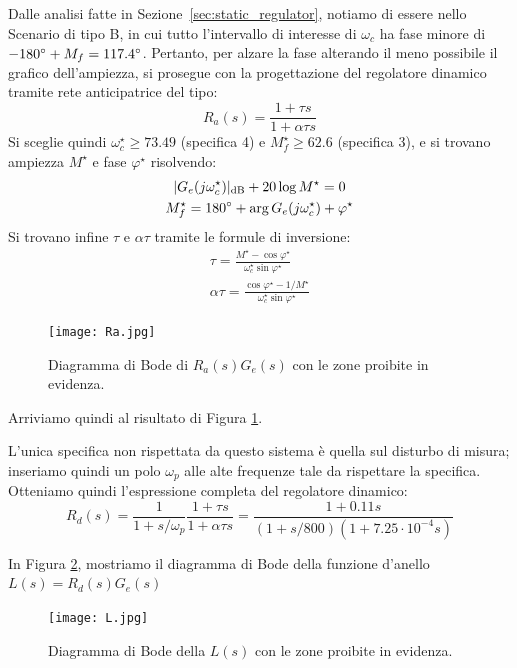 \documentclass[a4paper, 11pt]{article}
\begin{document}
	Dalle analisi fatte in Sezione~\ref{sec:static_regulator}, notiamo di essere nello Scenario di tipo B, in cui tutto l'intervallo di interesse di $\omega_c$ ha fase minore di $-180\degree+M_f = 117.4\degree$.
	Pertanto, per alzare la fase alterando il meno possibile il grafico dell'ampiezza, si prosegue con la progettazione del regolatore dinamico tramite rete anticipatrice del tipo:
	\[
	R_a(s) = \frac{1+\tau s}{1+\alpha\tau s}
	\]
	Si sceglie quindi $\omega_c^\star \ge 73.49$ (specifica 4) e $M_f^\star \ge 62.6$ (specifica 3), e si trovano ampiezza $M^\star$ e fase $\varphi^\star$ risolvendo:
	\begin{subequations}
		\begin{gather}
			|G_e(j\omega_c^\star)|_{\text{dB}}+20\log M^\star = 0 \\
			M_f^\star = 180\degree + \arg G_e(j\omega_c^\star) + \varphi^\star
		\end{gather}	
	\end{subequations}
	Si trovano infine $\tau$ e $\alpha\tau$ tramite le formule di inversione:
	\begin{subequations}
		\begin{gather}
			\tau = \frac{M^\star-\cos\varphi^\star}{\omega_c^\star\sin\varphi^\star} \\
			\alpha\tau = \frac{\cos\varphi^\star-1/M^\star}{\omega_c^\star\sin\varphi^\star}
		\end{gather}
	\end{subequations}
	
	\begin{figure}[h]
		\centering
		\texttt{[image: Ra.jpg]}
		\caption{Diagramma di Bode di $R_a(s)G_e(s)$ con le zone proibite in evidenza.}
		\label{fig:Ra}
	\end{figure}
	
	Arriviamo quindi al risultato di Figura \ref{fig:Ra}.
	
	L'unica specifica non rispettata da questo sistema è quella sul disturbo di misura; inseriamo quindi un polo $\omega_p$ alle alte frequenze tale da rispettare la specifica. Otteniamo quindi l'espressione completa del regolatore dinamico:
	\begin{equation}
		R_d(s) = \frac{1}{1+s/\omega_p}\frac{1+\tau s}{1+\alpha\tau s} = \frac{1+0.11s}{(1+s/800)(1+7.25\cdot10^{-4}s)}
	\end{equation}
	
	In Figura \ref{fig:L}, mostriamo il diagramma di Bode della funzione d'anello $L(s) = R_d(s) G_e(s)$
	
	\begin{figure}[h]
		\centering
		\texttt{[image: L.jpg]}
		\caption{Diagramma di Bode della $L(s)$ con le zone proibite in evidenza.}
		\label{fig:L}
	\end{figure}
	
\end{document}
